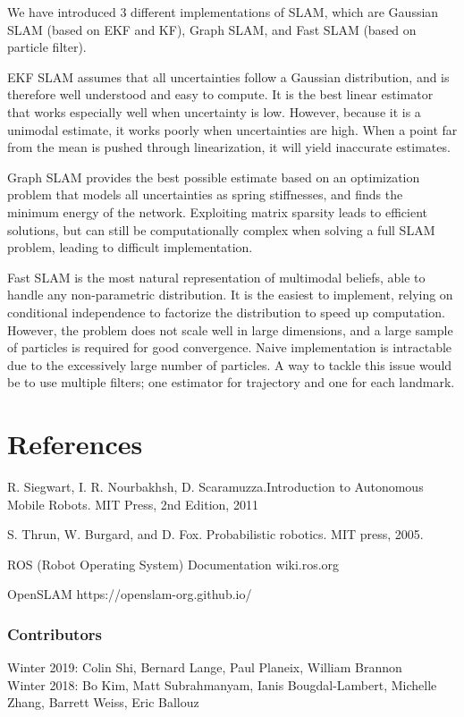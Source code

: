 \documentclass[twoside]{article}
\begin{document}
We have introduced 3 different implementations of SLAM, which are Gaussian SLAM (based on EKF and KF), Graph SLAM, and Fast SLAM (based on particle filter). 

EKF SLAM assumes that all uncertainties follow a Gaussian distribution, and is therefore well understood and easy to compute. It is the best linear estimator that works especially well when uncertainty is low. However, because it is a unimodal estimate, it works poorly when uncertainties are high. When a point far from the mean is pushed through linearization, it will yield inaccurate estimates.

Graph SLAM provides the best possible estimate based on an optimization problem that models all uncertainties as spring stiffnesses, and finds the minimum energy of the network. Exploiting matrix sparsity leads to efficient solutions, but can still be computationally complex when solving a full SLAM problem, leading to difficult implementation.

Fast SLAM is the most natural representation of multimodal beliefs, able to handle any non-parametric distribution. It is the easiest to implement, relying on conditional independence to factorize the distribution to speed up computation. However, the problem does not scale well in large dimensions, and a large sample of particles is required for good convergence. Naive implementation is intractable due to the excessively large number of particles. A way to tackle this issue would be to use multiple filters; one estimator for trajectory and one for each landmark.

\section {References}
\begin{enumerate}[label={[\arabic*]}]
\item R. Siegwart, I. R. Nourbakhsh, D. Scaramuzza.Introduction to Autonomous Mobile Robots. MIT Press, 2nd Edition, 2011
\item S. Thrun, W. Burgard, and D. Fox. Probabilistic robotics. MIT press, 2005.
\item ROS (Robot Operating System) Documentation wiki.ros.org
\item OpenSLAM https://openslam-org.github.io/


\subsubsection*{Contributors}
Winter 2019: Colin Shi, Bernard Lange, Paul Planeix, William Brannon
\\
Winter 2018: Bo Kim, Matt Subrahmanyam, Ianis Bougdal-Lambert, Michelle Zhang, Barrett Weiss, Eric Ballouz


\end{enumerate}
\end{document}
